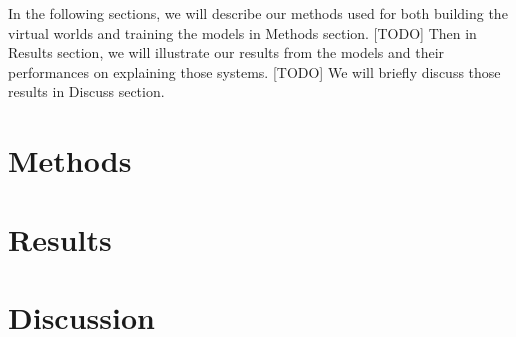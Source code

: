 \documentclass[12pt]{article}
\begin{document}
In the following sections, we will describe our methods used for both building the virtual worlds and training the models in Methods section. [TODO] Then in Results section, we will illustrate our results from the models and their performances on explaining those systems. [TODO] We will briefly discuss those results in Discuss section.

\section*{Methods}



\section*{Results}

\section*{Discussion}



%
%

\end{document}

